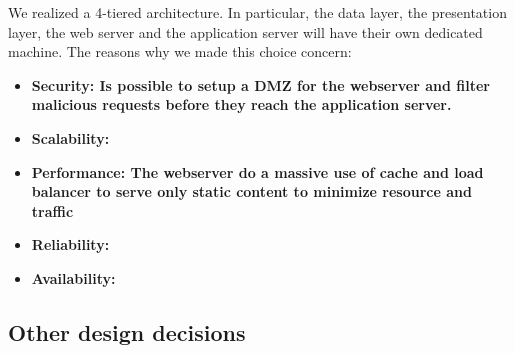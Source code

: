 We realized a 4-tiered architecture. In particular, the data layer, the presentation layer, the web server and the application server will have their own dedicated machine. The reasons why we made this choice concern:

\begin{itemize}
\item {\textbf{Security: Is possible to setup a DMZ for the webserver and filter malicious requests before they reach the application server.}}
\item {\textbf{Scalability:}}
\item {\textbf{Performance: The webserver do a massive use of cache and load balancer to serve only static content to minimize resource and traffic}}
\item {\textbf{Reliability:}}
\item {\textbf{Availability:}}
\end{itemize}


\subsection{Other design decisions }